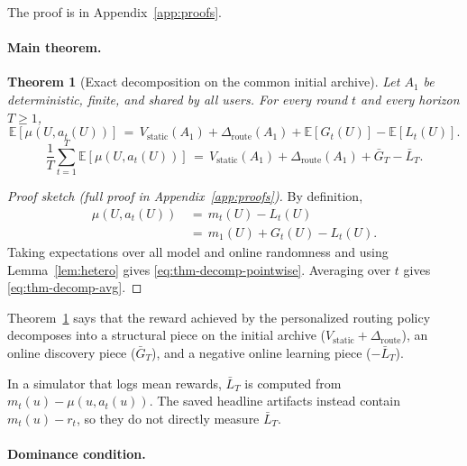 \documentclass{article} %
\newtheorem{theorem}{Theorem}
\providecommand{\E}{\mathbb{E}}
\begin{document}
The proof is in Appendix~\ref{app:proofs}.

\paragraph{Main theorem.}

\label{sec:method-thm-decomp}

\begin{theorem}[Exact decomposition on the common initial archive]
\label{thm:decomp}
Let $A_1$ be deterministic, finite, and shared by all users. For every round $t$ and every horizon $T \ge 1$,
\begin{equation}
\label{eq:thm-decomp-pointwise}
\E[\mu(U, a_t(U))]
\,=\, V_{\mathrm{static}}(A_1) + \Delta_{\mathrm{route}}(A_1) + \E[G_t(U)] - \E[L_t(U)].
\end{equation}
\begin{equation}
\label{eq:thm-decomp-avg}
\frac{1}{T}\sum_{t=1}^T \E[\mu(U, a_t(U))]
\,=\, V_{\mathrm{static}}(A_1) + \Delta_{\mathrm{route}}(A_1) + \bar G_T - \bar L_T.
\end{equation}
\end{theorem}

\begin{proof}[Proof sketch (full proof in Appendix~\ref{app:proofs})]
By definition,
\begin{equation*}
\begin{aligned}
\mu(U,a_t(U))
&\,=\,m_t(U)-L_t(U)\\
&\,=\,m_1(U)+G_t(U)-L_t(U).
\end{aligned}
\end{equation*}
Taking expectations over all model and online randomness and using
Lemma~\ref{lem:hetero} gives \eqref{eq:thm-decomp-pointwise}. Averaging over
$t$ gives \eqref{eq:thm-decomp-avg}.
\end{proof}

Theorem~\ref{thm:decomp} says that the reward achieved by the personalized routing policy decomposes into a structural piece on the initial archive ($V_{\mathrm{static}}+\Delta_{\mathrm{route}}$), an online discovery piece ($\bar G_T$), and a negative online learning piece ($-\bar L_T$).

In a simulator that logs mean rewards, \(\bar L_T\) is computed from
\(m_t(u)-\mu(u,a_t(u))\). The saved headline artifacts instead contain
\(m_t(u)-r_t\), so they do not directly measure \(\bar L_T\).

\paragraph{Dominance condition.}
\end{document}
